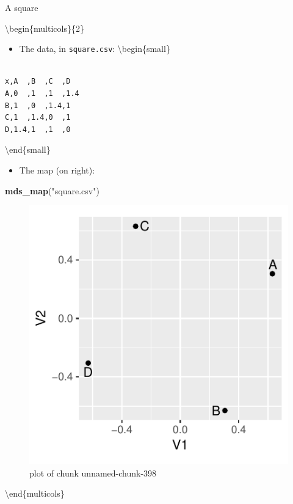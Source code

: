 \documentclass[ignorenonframetext,]{beamer}
\newenvironment{Shaded}{\begin{snugshade}}{\end{snugshade}}
\newcommand{\KeywordTok}[1]{\textcolor[rgb]{0.13,0.29,0.53}{\textbf{#1}}}
\newcommand{\NormalTok}[1]{#1}
\newcommand{\StringTok}[1]{\textcolor[rgb]{0.31,0.60,0.02}{#1}}
\providecommand{\tightlist}{%
  \setlength{\itemsep}{0pt}\setlength{\parskip}{0pt}}
\begin{document}
\begin{frame}[fragile]{A square}
\protect\hypertarget{a-square}{}

\textbackslash{}begin\{multicols\}\{2\}

\begin{itemize}
\tightlist
\item
  The data, in \texttt{square.csv}: \textbackslash{}begin\{small\}
\end{itemize}

\begin{verbatim}

x,A  ,B  ,C  ,D
A,0  ,1  ,1  ,1.4
B,1  ,0  ,1.4,1
C,1  ,1.4,0  ,1
D,1.4,1  ,1  ,0
\end{verbatim}

\textbackslash{}end\{small\}

\begin{itemize}
\tightlist
\item
  The map (on right):
\end{itemize}

\begin{Shaded}
\begin{Highlighting}[]
\KeywordTok{mds_map}\NormalTok{(}\StringTok{"square.csv"}\NormalTok{)}
\end{Highlighting}
\end{Shaded}

\begin{figure}
\centering
\includegraphics{figure/unnamed-chunk-398-1.pdf}
\caption{plot of chunk unnamed-chunk-398}
\end{figure}

\textbackslash{}end\{multicols\}

\end{frame}
\end{document}
